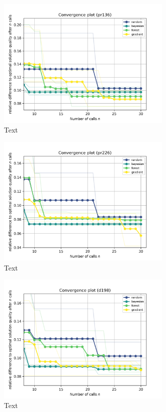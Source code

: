 \begin{figure}[h]
	\centering
	\includegraphics[width=0.75\textwidth]{results/part1/convergence_pr136.png}
	\caption{Text}
	\label{fig:convergence_pr136}
\end{figure}

\begin{figure}[h]
	\centering
	\includegraphics[width=0.75\textwidth]{results/part1/convergence_pr226.png}
	\caption{Text}
	\label{fig:convergence_pr226}
\end{figure}

\begin{figure}[h]
	\centering
	\includegraphics[width=0.75\textwidth]{results/part1/convergence_d198.png}
	\caption{Text}
	\label{fig:convergence_d198}
\end{figure}

